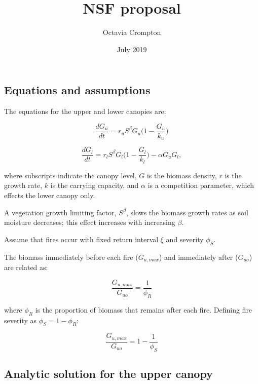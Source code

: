 \documentclass[12pt]{article}
\title{NSF proposal}
\author{Octavia Crompton}
\date{July 2019}
\begin{document}




\subsection*{ Equations and assumptions}

The equations for the upper  and lower  canopies are:

\begin{equation}
    \frac{dG_u}{dt} =  r_{u} S^\beta G_u \big(1-\frac{G_u}{k_u}\big)
    \label{G_u}
\end{equation}

 \begin{equation}
    \frac{d G_l}{dt} = r_l S^\beta G_l \big(1-\frac{G_l}{k_l}\big) - \alpha G_u G_l,
        \label{G_l}
\end{equation}


where subscripts indicate the canopy level, $G$ is the biomass density, $r$ is the growth rate, $k$ is the carrying capacity, and $\alpha$ is a competition parameter, which effects the lower canopy only. 

A vegetation growth limiting factor, $S^\beta$, slows the biomass growth rates as soil moisture decreases; this effect increases with increasing $\beta$.


Assume that fires occur with fixed return interval $\xi$  and severity $\phi_S$. 

The biomass immediately before each fire  ($G_{u,max}$) and immediately after ($G_{uo}$) are related as:

\begin{equation}
    \frac{G_{u,max}}{G_{uo}} = \frac{1}{\phi_R}
\end{equation}

where $\phi_R$ is the proportion of biomass that remains after each fire.  Defining fire severity as $\phi_S = 1-\phi_R$:

\begin{equation}
    \frac{G_{u,max}}{G_{uo}} = 1 - \frac{1}{\phi_S}
\end{equation}


\subsection*{  Analytic solution for the upper canopy}
\end{document}

